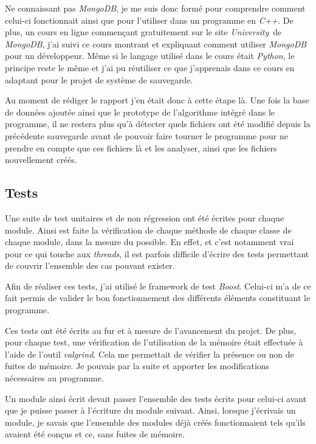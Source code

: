 \documentclass[a4paper,10pt, twoside]{report}
\begin{document}
\begin{spacing}{1.2}
Ne connaissant pas \textit{MongoDB}, je me suis donc formé pour comprendre
comment celui-ci fonctionnait ainsi que pour l'utiliser dans un programme en
\textit{C++}. De plus, un cours en ligne commençant gratuitement sur le site
\flqq\textit{University}\frqq~de \textit{MongoDB}\cite{refMongoDBUniversity},
j'ai suivi ce cours montrant et expliquant comment utiliser \textit{MongoDB}
pour un développeur. Même si le langage utilisé dans le cours était
\textit{Python}, le principe reste le même et j'ai pu réutiliser ce que
j'apprenais dans ce cours en adaptant pour le projet de système de sauvegarde.

Au moment de rédiger le rapport j'en était donc à cette étape là. Une fois
la base de données ajoutée ainsi que le prototype de l'algorithme
intégré dans le programme, il ne restera plus qu'à détecter quels
fichiers ont été modifié depuis la précédente sauvegarde avant de
pouvoir faire tourner le programme pour ne prendre en compte que ces fichiers
là et les analyser, ainsi que les fichiers nouvellement créés.

\subsection{Tests}

Une suite de test unitaires et de non régression ont été écrites pour chaque
module. Ainsi est faite la vérification de chaque méthode de chaque classe de
chaque module, dans la mesure du possible. En effet, et c'est notamment vrai
pour ce qui touche aux \textit{threads}, il est parfois difficile d'écrire des
tests permettant de couvrir l'ensemble des cas pouvant exister.

Afin de réaliser ces tests, j'ai utilisé le framework de test \textit{Boost}.
Celui-ci m'a de ce fait permis de valider le bon fonctionnement des différents
éléments constituant le programme.

Ces tests ont été écrits au fur et à mesure de l'avancement du projet.
De plus, pour chaque test, une vérification de l'utilisation de la mémoire
était effectuée à l'aide de l'outil \textit{valgrind}. Cela me permettait
de vérifier la présence ou non de fuites de mémoire. Je pouvais par la
suite et apporter les modifications nécessaires au programme.

Un module ainsi écrit devait passer l'ensemble des tests écrits pour celui-ci
avant que je puisse passer à l'écriture du module suivant. Ainsi, lorsque
j'écrivais un module, je savais que l'ensemble des modules déjà créés
fonctionnaient tels qu'ils avaient été conçus et ce, sans fuites de mémoire.


\end{spacing}
\end{document}

